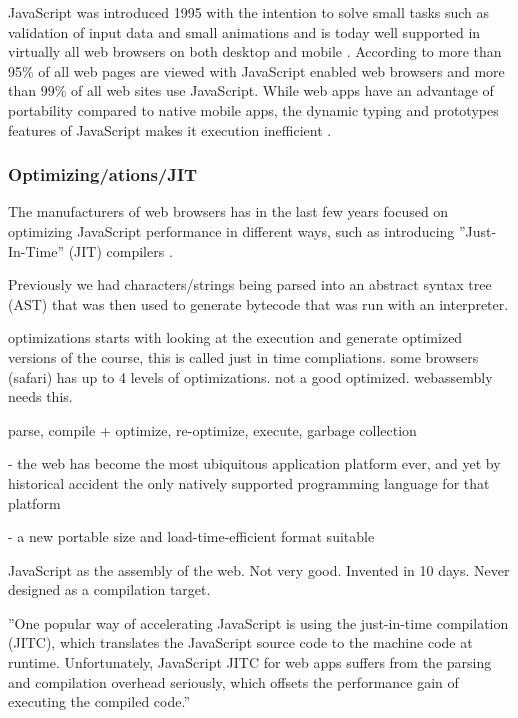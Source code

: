 JavaScript was introduced 1995 with the intention to solve small tasks such as validation of input data and small animations \parencite{Moller2018} and is today well supported in virtually all web browsers on both desktop and mobile \parencite{Zakai2011}. According to \textcite{TiwariSolihin2012} more than 95\% of all web pages are viewed with JavaScript enabled web browsers and more than 99\% of all web sites use JavaScript. While web apps have an advantage of portability compared to native mobile apps, the dynamic typing and prototypes features of JavaScript makes it execution inefficient \parencite{ParkJungMoon2015}.

\subsubsection*{Optimizing/ations/JIT}

The manufacturers of web browsers has in the last few years focused on optimizing JavaScript performance in different ways, such as introducing ''Just-In-Time'' (JIT) compilers \parencite{HerreraChenLavoieHendren2018}.

Previously we had characters/strings being parsed into an abstract syntax tree (AST) that was then used to generate bytecode that was run with an interpreter.

optimizations starts with looking at the execution and generate optimized versions of the course, this is called just in time compliations. some browsers (safari) has up to 4 levels of optimizations. not a good optimized. webassembly needs this.


parse, compile + optimize, re-optimize, execute, garbage collection


- the web has become the most ubiquitous application platform ever, and yet by historical accident the only natively supported programming language for that platform

- a new portable size and load-time-efficient format suitable



JavaScript as the assembly of the web. Not very good. Invented in 10 days. Never designed as a compilation target.



''One popular way of accelerating JavaScript is using the just-in-time compilation (JITC), which translates the JavaScript source code to the machine code at runtime. Unfortunately, JavaScript JITC for web apps suffers from the parsing and compilation overhead seriously, which offsets the performance gain of executing the compiled code.'' \parencite{ParkJungMoon2015}


